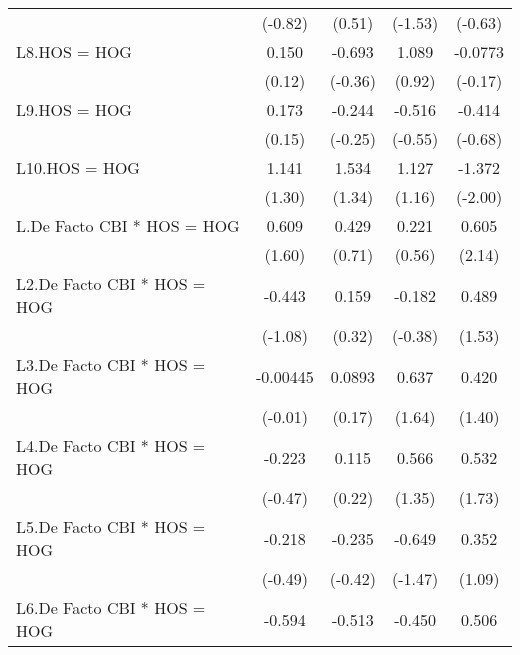 {\begin{longtable}{l*{4}{c}}
                &  (-0.82)         &   (0.51)         &  (-1.53)         &  (-0.63)         \\
\addlinespace
L8.HOS = HOG    &    0.150         &   -0.693         &    1.089         &  -0.0773         \\
                &   (0.12)         &  (-0.36)         &   (0.92)         &  (-0.17)         \\
\addlinespace
L9.HOS = HOG    &    0.173         &   -0.244         &   -0.516         &   -0.414         \\
                &   (0.15)         &  (-0.25)         &  (-0.55)         &  (-0.68)         \\
\addlinespace
L10.HOS = HOG   &    1.141         &    1.534         &    1.127         &   -1.372\sym{*}  \\
                &   (1.30)         &   (1.34)         &   (1.16)         &  (-2.00)         \\
\addlinespace
L.De Facto CBI * HOS = HOG&    0.609         &    0.429         &    0.221         &    0.605\sym{*}  \\
                &   (1.60)         &   (0.71)         &   (0.56)         &   (2.14)         \\
\addlinespace
L2.De Facto CBI * HOS = HOG&   -0.443         &    0.159         &   -0.182         &    0.489         \\
                &  (-1.08)         &   (0.32)         &  (-0.38)         &   (1.53)         \\
\addlinespace
L3.De Facto CBI * HOS = HOG& -0.00445         &   0.0893         &    0.637         &    0.420         \\
                &  (-0.01)         &   (0.17)         &   (1.64)         &   (1.40)         \\
\addlinespace
L4.De Facto CBI * HOS = HOG&   -0.223         &    0.115         &    0.566         &    0.532         \\
                &  (-0.47)         &   (0.22)         &   (1.35)         &   (1.73)         \\
\addlinespace
L5.De Facto CBI * HOS = HOG&   -0.218         &   -0.235         &   -0.649         &    0.352         \\
                &  (-0.49)         &  (-0.42)         &  (-1.47)         &   (1.09)         \\
\addlinespace
L6.De Facto CBI * HOS = HOG&   -0.594         &   -0.513         &   -0.450         &    0.506         \\

\end{longtable}}
